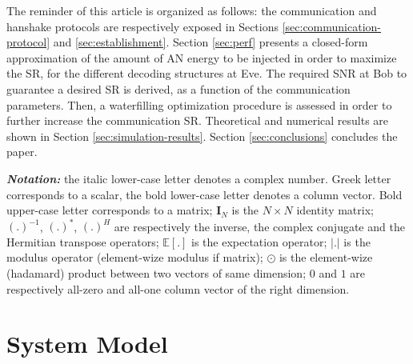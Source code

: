\documentclass[journal,comsoc]{IEEEtran}
\newcommand{\module}[1]{\left|#1\right|}
\newcommand{\EX}[1]{\mathbb{E} \left[#1\right]}%
\newcommand{\vect}[1]{\boldsymbol{\mathrm{#1}}}
\begin{document}
The reminder of this article is organized as follows: the communication and hanshake protocols are respectively exposed in Sections \ref{sec:communication-protocol} and \ref{sec:establishment}. Section \ref{sec:perf} presents a closed-form approximation of the amount of AN energy to be injected in order to maximize the SR, for the different decoding structures at Eve. The required SNR at Bob to guarantee a desired SR is derived, as a function of the communication parameters. Then, a waterfilling optimization procedure is assessed in order to further increase the communication SR. Theoretical and numerical results are shown in Section \ref{sec:simulation-results}. Section \ref{sec:conclusions} concludes the paper.

\textit{\textbf{Notation:}} the italic lower-case letter denotes a complex number. Greek letter corresponds to a scalar, the bold lower-case letter denotes a column vector. Bold upper-case letter corresponds to a matrix; $\textbf{I}_N$ is the $N \times N$ identity matrix; $(.)^{-1}$, $(.)^{*}$, $(.)^{H}$ are respectively the inverse, the complex conjugate and the Hermitian transpose operators; $\EX{.}$ is the expectation operator; $\module{.}$ is the modulus operator (element-wize modulus if matrix); $\odot$ is the element-wize (hadamard) product between two vectors of same dimension; $\vect{0}$ and $\vect{1}$ are respectively all-zero and all-one column vector of the right dimension.







\section{System Model}\label{sec:system-model}
\end{document}
